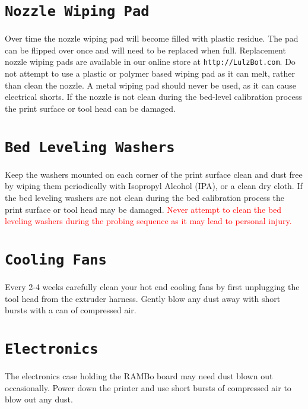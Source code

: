 \section{\texttt{Nozzle Wiping Pad}}
Over time the nozzle wiping pad will become filled with plastic residue. The pad can be flipped over once and will need to be replaced when full. Replacement nozzle wiping pads are available in our online store at \texttt{http://LulzBot.com}. Do not attempt to use a plastic or polymer based wiping pad as it can melt, rather than clean the nozzle. A metal wiping pad should never be used, as it can cause electrical shorts. If the nozzle is not clean during the bed-level calibration process the print surface or tool head can be damaged.

\section{\texttt{Bed Leveling Washers}}
Keep the washers mounted on each corner of the print surface clean and dust free by wiping them periodically with Isopropyl Alcohol (IPA), or a clean dry cloth. If the bed leveling washers are not clean during the bed calibration process the print surface or tool head may be damaged. \textcolor{red}{Never attempt to clean the bed leveling washers during the probing sequence as it may lead to personal injury.}

\section{\texttt{Cooling Fans}}
Every 2-4 weeks carefully clean your hot end cooling fans by first unplugging the tool head from the extruder harness. Gently blow any dust away with short bursts with a can of compressed air. 


\section{\texttt{Electronics}}
The electronics case holding the RAMBo board may need dust blown out occasionally. Power down the printer and use short bursts of compressed air to blow out any dust.
